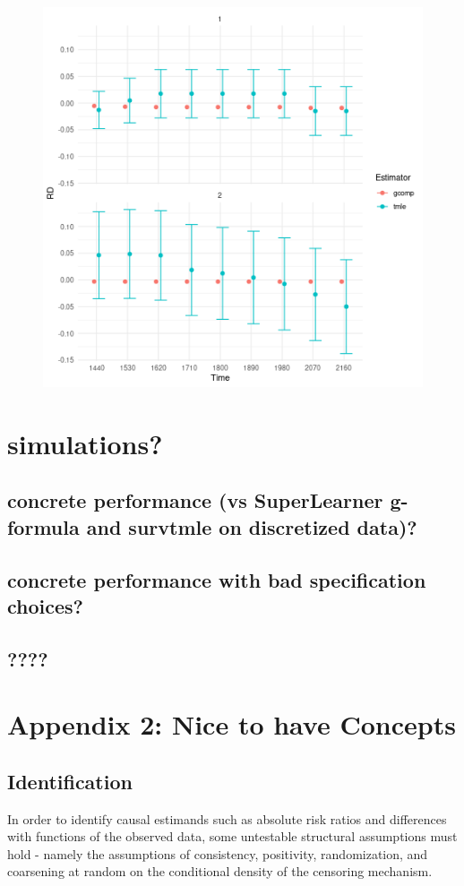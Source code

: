\documentclass{report}
\newcommand{\1}{\ensuremath{\mathbf{1}}}
\begin{document}
\begin{figure}[H]
\includegraphics[width=0.9\linewidth]{concrete-pbc.png}
\end{figure}

\section{simulations?}
\label{sec:org44b4fd2}
\subsection{concrete performance (vs SuperLearner g-formula and survtmle on discretized data)?}
\label{sec:orgddbb103}
\subsection{concrete performance with bad specification choices?}
\label{sec:org30560a3}
\subsection{????}
\label{sec:orga18285f}

\section{Appendix 2: Nice to have Concepts}
\label{sec:orgb2cde63}

\subsection{Identification}
\label{identification}
In order to identify causal estimands such as absolute risk ratios and differences with functions of the observed data, some untestable structural assumptions must hold - namely the assumptions of consistency, positivity, randomization, and coarsening at random on the conditional density of the censoring mechanism. 
\end{document}

